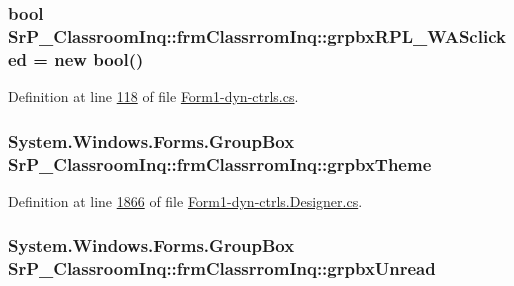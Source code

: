 \hypertarget{class_sr_p___classroom_inq_1_1frm_classrrom_inq_a97ab9f8512cd6b2f9648651d5c5d404b}{
\subsubsection[{grpbx\-R\-P\-L\-\_\-\-W\-A\-Sclicked}]{\setlength{\rightskip}{0pt plus 5cm}bool {\bf \-Sr\-P\-\_\-\-Classroom\-Inq\-::frm\-Classrrom\-Inq\-::grpbx\-R\-P\-L\-\_\-\-W\-A\-Sclicked} = new bool()}}
\label{class_sr_p___classroom_inq_1_1frm_classrrom_inq_a97ab9f8512cd6b2f9648651d5c5d404b}


\-Definition at line \hyperlink{_form1-dyn-ctrls_8cs_source_l00118}{118} of file \hyperlink{_form1-dyn-ctrls_8cs_source}{\-Form1-\/dyn-\/ctrls.\-cs}.

\hypertarget{class_sr_p___classroom_inq_1_1frm_classrrom_inq_a8973e652358c775fec622ec378a52bf9}{
\subsubsection[{grpbx\-Theme}]{\setlength{\rightskip}{0pt plus 5cm}\-System.\-Windows.\-Forms.\-Group\-Box {\bf \-Sr\-P\-\_\-\-Classroom\-Inq\-::frm\-Classrrom\-Inq\-::grpbx\-Theme}}}
\label{class_sr_p___classroom_inq_1_1frm_classrrom_inq_a8973e652358c775fec622ec378a52bf9}


\-Definition at line \hyperlink{_form1-dyn-ctrls_8_designer_8cs_source_l01866}{1866} of file \hyperlink{_form1-dyn-ctrls_8_designer_8cs_source}{\-Form1-\/dyn-\/ctrls.\-Designer.\-cs}.

\hypertarget{class_sr_p___classroom_inq_1_1frm_classrrom_inq_a0e65b517d6f3d5bc8e159ff6283dc508}{
\subsubsection[{grpbx\-Unread}]{\setlength{\rightskip}{0pt plus 5cm}\-System.\-Windows.\-Forms.\-Group\-Box {\bf \-Sr\-P\-\_\-\-Classroom\-Inq\-::frm\-Classrrom\-Inq\-::grpbx\-Unread}}}
\label{class_sr_p___classroom_inq_1_1frm_classrrom_inq_a0e65b517d6f3d5bc8e159ff6283dc508}


